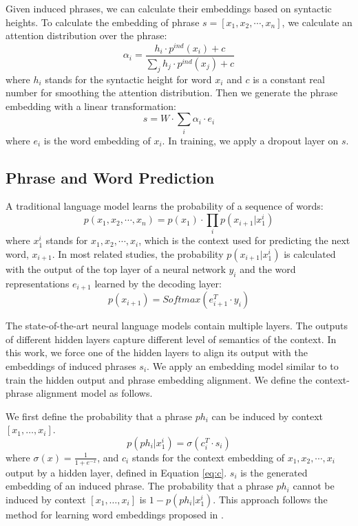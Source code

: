 \documentclass[11pt,a4paper]{article}
\begin{document}
Given induced phrases, we can calculate their embeddings based on syntactic heights. To calculate the embedding of phrase $s = [x_1, x_2, \cdots, x_n]$, we calculate an attention distribution over the phrase:
\begin{equation}
\label{eq:att}
\alpha_i = \frac{h_i \cdot p^{ind} (x_i) + c}{\sum_j h_j \cdot p^{ind} (x_j) + c}
\end{equation}
where $h_i$ stands for the syntactic height for word $x_i$ and $c$ is a constant real number for smoothing the attention distribution. Then we generate the phrase embedding with a linear transformation:
\begin{equation}
s = W \cdot \sum_i \alpha_i \cdot e_i
\end{equation}
where $e_i$ is the word embedding of $x_i$. In training, we apply a dropout layer on $s$.

\subsection{Phrase and Word Prediction}

A traditional language model learns the probability of a sequence of words:
\begin{equation}
p(x_1, x_2, \cdots, x_n) = p(x_1) \cdot \prod_i p(x_{i+1} | x_1^{i})
\end{equation}
where $x_1^i$ stands for $x_1, x_2, \cdots, x_i$, which is the context used for predicting the next word, $x_{i+1}$. In most related studies, the probability $p(x_{i+1}|x_1^i)$ is calculated with the output of the top layer of a neural network $y_i$ and the word representations $e_{i+1}$ learned by the decoding layer:
\begin{equation}
p(x_{i+1}) = Softmax(e_{i+1}^T \cdot y_i)
\end{equation}

The state-of-the-art neural language models contain multiple layers. The outputs of different hidden layers capture different level of semantics of the context. In this work, we force one of the hidden layers to align its output with the embeddings of induced phrases $s_i$. We apply an embedding model similar to \citet{mikolov2013distributed} to train the hidden output and phrase embedding alignment. We define the context-phrase alignment model as follows.


We first define the probability that a phrase $ph_i$ can be induced by context $[x_1, \dots, x_i]$.
\begin{equation}
p(ph_i | x_1^i) = \sigma(c_i^T \cdot s_i)
\end{equation}
where $\sigma(x) = \frac{1}{1 + e^{-x}}$, and $c_i$ stands for the context embedding of $x_1, x_2, \cdots, x_i$ output by a hidden layer, defined in Equation \ref{eq:c}. $s_i$ is the generated embedding of an induced phrase. The probability that a phrase $ph_i$ cannot be induced by context $[x_1, \dots, x_i]$ is $1 - p(ph_i | x_1^i)$. This approach follows the method for learning word embeddings proposed in \citet{mikolov2013distributed}.
\end{document}
